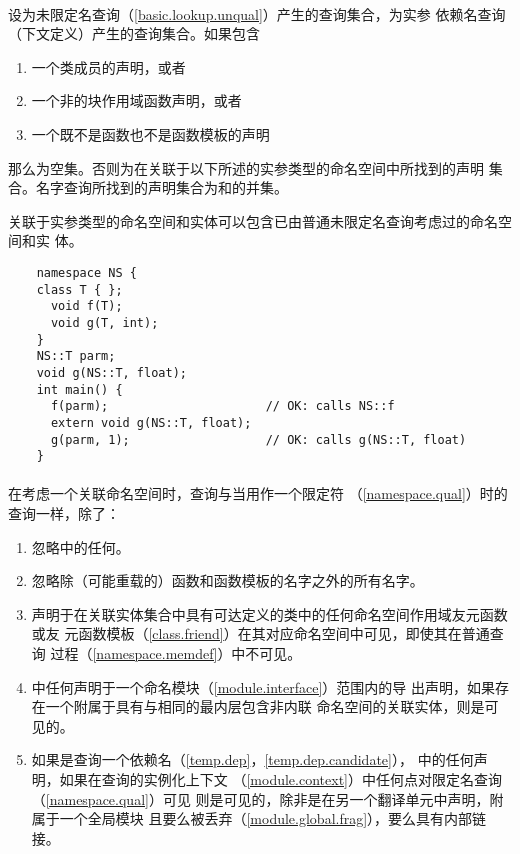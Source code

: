 \paragraph{} %
设为未限定名查询（\ref{basic.lookup.unqual}）产生的查询集合，为实参
依赖名查询（下文定义）产生的查询集合。如果包含
\begin{enumerate}
  \item 一个类成员的声明，或者
  \item 一个非的块作用域函数声明，或者
  \item 一个既不是函数也不是函数模板的声明
\end{enumerate}
那么为空集。否则为在关联于以下所述的实参类型的命名空间中所找到的声明
集合。名字查询所找到的声明集合为和的并集。

\begin{note}
  关联于实参类型的命名空间和实体可以包含已由普通未限定名查询考虑过的命名空间和实
  体。
\end{note}

\begin{example}
  \begin{lstlisting}
    namespace NS {
    class T { };
      void f(T);
      void g(T, int);
    }
    NS::T parm;
    void g(NS::T, float);
    int main() {
      f(parm);                      // OK: calls NS::f
      extern void g(NS::T, float);
      g(parm, 1);                   // OK: calls g(NS::T, float)
    }
  \end{lstlisting}
\end{example}

\paragraph{} %
在考虑一个关联命名空间时，查询与当用作一个限定符
（\ref{namespace.qual}）时的查询一样，除了：
\begin{enumerate}
  \item 忽略中的任何。
  \item 忽略除（可能重载的）函数和函数模板的名字之外的所有名字。
  \item 声明于在关联实体集合中具有可达定义的类中的任何命名空间作用域友元函数或友
        元函数模板（\ref{class.friend}）在其对应命名空间中可见，即使其在普通查询
        过程（\ref{namespace.memdef}）中不可见。
  \item {}中任何声明于一个命名模块（\ref{module.interface}）范围内的导
        出声明，如果存在一个附属于具有与相同的最内层包含非内联
        命名空间的关联实体，则是可见的。
  \item 如果是查询一个依赖名（\ref{temp.dep}，\ref{temp.dep.candidate}），
        中的任何声明，如果在查询的实例化上下文
        （\ref{module.context}）中任何点对限定名查询（\ref{namespace.qual}）可见
        则是可见的，除非是在另一个翻译单元中声明，附属于一个全局模块
        且要么被丢弃（\ref{module.global.frag}），要么具有内部链接。
\end{enumerate}

